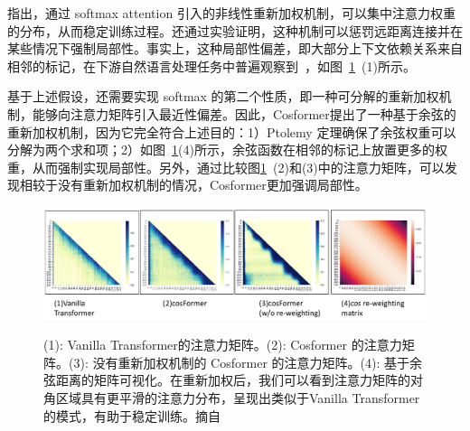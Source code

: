 \vspace{-2mm}

\cite{titsias2016one, gao2017properties} 指出，通过 softmax attention 引入的非线性重新加权机制，可以集中注意力权重的分布，从而稳定训练过程。\cite{zhen2022cosformer}还通过实验证明，这种机制可以惩罚远距离连接并在某些情况下强制局部性。事实上，这种局部性偏差，即大部分上下文依赖关系来自相邻的标记，在下游自然语言处理任务中普遍观察到~\cite{clark2019does, kovaleva2019revealing}，如图~\ref{fig: reweight}~(1)所示。

基于上述假设，还需要实现 softmax 的第二个性质，即一种可分解的重新加权机制，能够向注意力矩阵引入最近性偏差。因此，Cosformer提出了一种基于余弦的重新加权机制，因为它完全符合上述目的：1）Ptolemy 定理确保了余弦权重可以分解为两个求和项；2）如图~\ref{fig: reweight}(4)所示，余弦函数在相邻的标记上放置更多的权重，从而强制实现局部性。另外，通过比较图\ref{fig: reweight}~(2)和(3)中的注意力矩阵，可以发现相较于没有重新加权机制的情况，Cosformer更加强调局部性。

\begin{figure}[t]
   \begin{center}
   {\includegraphics[width=1\linewidth]{figs/cosformer/reweight.pdf}} 
   \vspace{-8mm}
   \end{center}
\caption{(1): Vanilla Transformer的注意力矩阵。(2): Cosformer 的注意力矩阵。(3): 没有重新加权机制的 Cosformer 的注意力矩阵。(4): 基于余弦距离的矩阵可视化。在重新加权后，我们可以看到注意力矩阵的对角区域具有更平滑的注意力分布，呈现出类似于Vanilla Transformer的模式，有助于稳定训练。摘自~\cite{zhen2022cosformer}}
\vspace{-2mm}
   \label{fig: reweight}
\end{figure}

